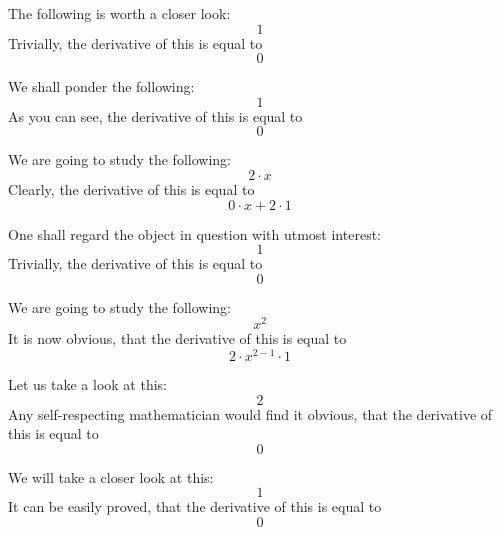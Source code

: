 \documentclass{article}
\begin{document}
The following is worth a closer look:
\begin{equation}
1 
\end{equation}
Trivially, the derivative of this is equal to
\begin{equation}
0 
\end{equation}

We shall ponder the following:
\begin{equation}
1 
\end{equation}
As you can see, the derivative of this is equal to
\begin{equation}
0 
\end{equation}

We are going to study the following:
\begin{equation}
2 \cdot x 
\end{equation}
Clearly, the derivative of this is equal to
\begin{equation}
0 \cdot x + 2 \cdot 1 
\end{equation}

One shall regard the object in question with utmost interest:
\begin{equation}
1 
\end{equation}
Trivially, the derivative of this is equal to
\begin{equation}
0 
\end{equation}

We are going to study the following:
\begin{equation}
x ^{2 } 
\end{equation}
It is now obvious, that the derivative of this is equal to
\begin{equation}
2 \cdot x ^{2 - 1 } \cdot 1 
\end{equation}

Let us take a look at this:
\begin{equation}
2 
\end{equation}
Any self-respecting mathematician would find it obvious, that the derivative of this is equal to
\begin{equation}
0 
\end{equation}

We will take a closer look at this:
\begin{equation}
1 
\end{equation}
It can be easily proved, that the derivative of this is equal to
\begin{equation}
0 
\end{equation}
\end{document}
